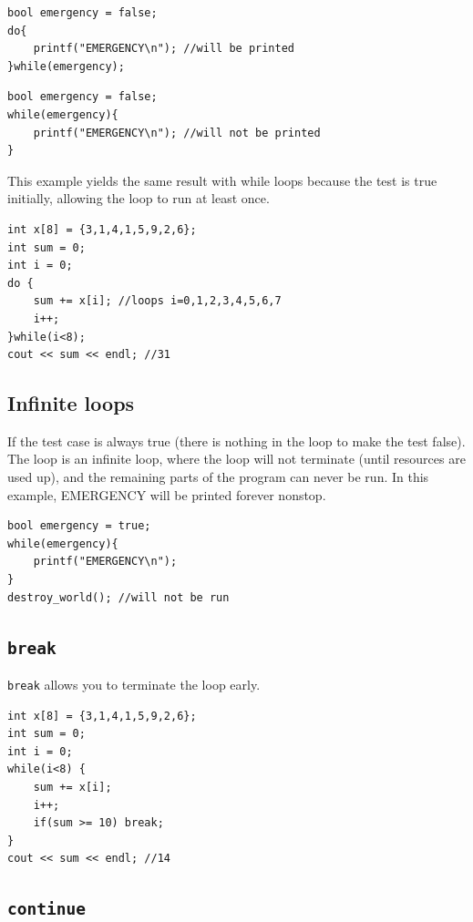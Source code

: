 \begin{lstlisting}
bool emergency = false;
do{
    printf("EMERGENCY\n"); //will be printed
}while(emergency);
\end{lstlisting}

\begin{lstlisting}
bool emergency = false;
while(emergency){
    printf("EMERGENCY\n"); //will not be printed
}
\end{lstlisting}

This example yields the same result with while loops because the test is true initially, allowing the loop to run at least once.

\begin{lstlisting}
int x[8] = {3,1,4,1,5,9,2,6};
int sum = 0;
int i = 0;
do { 
    sum += x[i]; //loops i=0,1,2,3,4,5,6,7
    i++;
}while(i<8);
cout << sum << endl; //31
\end{lstlisting}

\subsection{Infinite loops}

If the test case is always true (there is nothing in the loop to make the test false). The loop is an infinite loop, where the loop will not terminate (until resources are used up), and the remaining parts of the program can never be run. In this example, EMERGENCY will be printed forever nonstop.

\begin{lstlisting}
bool emergency = true;
while(emergency){
    printf("EMERGENCY\n");
}
destroy_world(); //will not be run
\end{lstlisting}
\vspace{6mm}

\subsection{\texttt{break}}

\texttt{break} allows you to terminate the loop early.

\begin{lstlisting}
int x[8] = {3,1,4,1,5,9,2,6};
int sum = 0;
int i = 0;
while(i<8) { 
    sum += x[i];
    i++;
    if(sum >= 10) break;
}
cout << sum << endl; //14
\end{lstlisting}

\subsection{\texttt{continue}}

